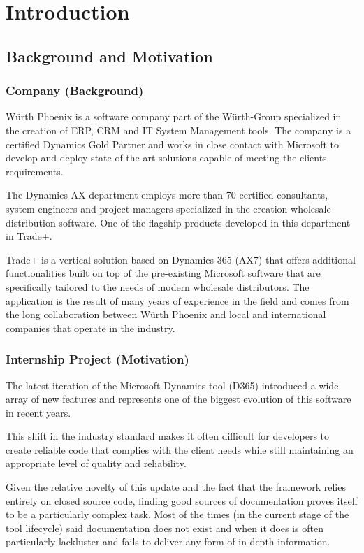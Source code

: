\chapter{Introduction}

\section{Background and Motivation} 

\subsection{Company (Background)}
Würth Phoenix is a software company part of the Würth-Group specialized in the creation of ERP, CRM and IT System Management tools. The company is a certified Dynamics Gold Partner and works in close contact with Microsoft to develop and deploy state of the art solutions capable of meeting the clients requirements.

The Dynamics AX department employs more than 70 certified consultants, system engineers and project managers specialized in the creation wholesale distribution software. One of the flagship products developed in this department in Trade+.

Trade+ is a vertical solution based on Dynamics 365 (AX7) that offers additional functionalities built on top of the pre-existing Microsoft software that are specifically tailored to the needs of modern wholesale distributors. The application is the result of many years of experience in the field and comes from the long collaboration between Würth Phoenix and local and international companies that operate in the industry.

\subsection{Internship Project (Motivation)}
The latest iteration of the Microsoft Dynamics tool (D365) introduced a wide array of new features and represents one of the biggest evolution of this software in recent years.   

This shift in the industry standard makes it often difficult for developers to create reliable code that complies with the client needs while still maintaining an appropriate level of quality and reliability.

Given the relative novelty of this update and the fact that the framework relies entirely on closed source code, finding good sources of documentation proves itself to be a particularly complex task. Most of the times (in the current stage of the tool lifecycle) said documentation does not exist and when it does is often particularly lackluster and fails to deliver any form of in-depth information.

